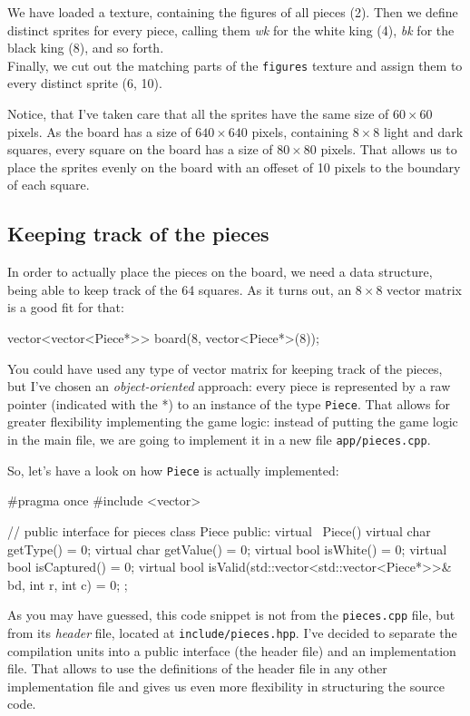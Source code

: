 We have loaded a texture, containing the figures of all pieces (2).
Then we define distinct sprites for every piece, calling them \emph{wk} for the white king (4),
\emph{bk} for the black king (8), and so forth.\\
Finally, we cut out the matching parts of the \texttt{figures} texture and assign
them to every distinct sprite (6, 10).


Notice, that I've taken care that all the sprites have the same size of
$60 \times 60$ pixels.
As the board has a size of $640 \times 640$ pixels, containing $8 \times 8$ light and dark squares,
every square on the board has a size of $80 \times 80$ pixels.
That allows us to place the sprites evenly on the board with an offeset of 10 pixels to the
boundary of each square.

\subsection{Keeping track of the pieces}
In order to actually place the pieces on the board, we need a data structure, being able to
keep track of the 64 squares.
As it turns out, an $8 \times 8$ vector matrix is a good fit for that:

\begin{cpp}
vector<vector<Piece*>> board(8, vector<Piece*>(8));
\end{cpp}

You could have used any type of vector matrix for keeping track of the pieces,
but I've chosen an \emph{object-oriented} approach:
every piece is represented by a raw pointer (indicated with the *) to an instance of the type
\texttt{Piece}.
That allows for greater flexibility implementing the game logic: instead of putting
the game logic in the main file, we are going to implement it in a new file \texttt{app/pieces.cpp}.

So, let's have a look on how \texttt{Piece} is actually implemented:

\begin{cpp}
#pragma once
#include <vector>

// public interface for pieces
class Piece {
public:
  virtual ~Piece() {}
  virtual char getType() = 0;
  virtual char getValue() = 0;
  virtual bool isWhite() = 0;
  virtual bool isCaptured() = 0;
  virtual bool isValid(std::vector<std::vector<Piece*>>& bd,
                       int r, int c) = 0;
};
\end{cpp}

As you may have guessed, this code snippet is not from the \texttt{pieces.cpp} file, but from its
\emph{header} file, located at \texttt{include/pieces.hpp}.
I've decided to separate the compilation units into a public interface (the header file) and
an implementation file.
That allows to use the definitions of the header file in any other implementation file and
gives us even more flexibility in structuring the source code.

